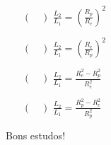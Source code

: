 \documentclass[a4paper, 12pt]{article}
\begin{document}
\begin{flushleft}
\begin{itemize}
\begin{itemize}
					\begin{multicols}{2} \begin{itemize}
						\item[$(\quad)$] $\frac{L_2}{L_1} = \left( \frac{R_p}{R_e} \right)^2$
						\item[$(\quad)$] $\frac{L_2}{L_1} = \left( \frac{R_e}{R_p} \right)^2 $
						\item[$(\quad)$] $\frac{L_2}{L_1} = \frac{R_e^2-R_p^2}{R_e^2}$
						\item[$(\quad)$] $\frac{L_2}{L_1} = \frac{R_p^2-R_e^2}{R_p^2}$
					\end{itemize} \end{multicols}
			\end{itemize}
	\end{itemize}
	\end{flushleft}
	\begin{flushright}
		\begin{large}
			Bons estudos!
		\end{large}
	\end{flushright}
\end{document}
